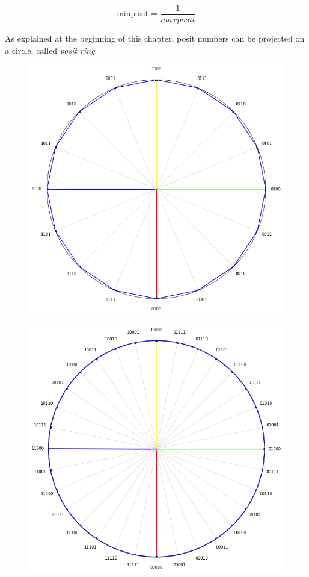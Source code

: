 \[
\text{minposit} = \frac{1}{maxposit}
\]

As explained at the beginning of this chapter, posit numbers can be projected on a circle, called \textit{posit ring}.

\begin{figure}
\centering
\begin{minipage}{.5\textwidth}
  \centering
  \includegraphics[width=0.9\linewidth]{img/posit4xRing.png}
  \label{fig:posit4xRing}
\end{minipage}%
\begin{minipage}{.5\textwidth}
  \centering
  \includegraphics[width=0.9\linewidth]{img/posit5ring.png}
  \label{fig:posit5xRing}
\end{minipage}
\end{figure}

